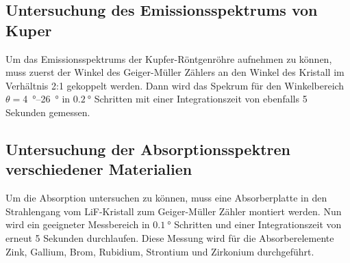 \subsection{Untersuchung des Emissionsspektrums von Kuper}
\label{ssec:emission}

Um das Emissionsspektrums der Kupfer-Röntgenröhre aufnehmen zu können, muss zuerst der Winkel des Geiger-Müller Zählers an den Winkel des Kristall im Verhältnis 2:1 gekoppelt werden.
Dann wird das Spekrum für den Winkelbereich $\theta=$\SIrange{4}{26}{\degree} in $\SI{0.2}{\degree}$ Schritten mit einer Integrationszeit von ebenfalls 5 Sekunden gemessen.

\subsection{Untersuchung der Absorptionsspektren verschiedener Materialien}
\label{ssec:absorption}

Um die Absorption untersuchen zu können, muss eine Absorberplatte in den Strahlengang vom LiF-Kristall zum Geiger-Müller Zähler montiert werden.
Nun wird ein geeigneter Messbereich in $\SI{0.1}{\degree}$ Schritten und einer Integrationszeit von erneut 5 Sekunden durchlaufen.
Diese Messung wird für die Absorberelemente Zink, Gallium, Brom, Rubidium, Strontium und Zirkonium durchgeführt.